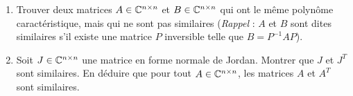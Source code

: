 \begin{enumerate}
\item Trouver deux matrices $A \in \Bbb C^{n \times n}$ et $B \in \Bbb C^{n \times n}$ qui ont le même polynôme caractéristique, mais qui ne sont pas similaires (\emph{Rappel} : $A$ et $B$ sont dites similaires s'il existe une matrice $P$ inversible telle que $B = P^{-1} A P$).

\item Soit $J \in \Bbb C^{n \times n}$ une matrice en forme normale de Jordan. Montrer que $J$ et $J^T$ sont similaires. En déduire que pour tout $A \in \Bbb C^{n \times n}$, les matrices $A$ et $A^T$ sont similaires.
\end{enumerate}
